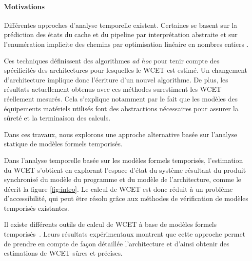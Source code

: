       \paragraph{Motivations}
      { Différentes approches d'analyse temporelle existent. Certaines se basent
        sur la prédiction des états du cache et du pipeline par interprétation
        abstraite et sur l'enumération implicite des chemins par optimisation
        linéaire en nombres entiers \cite{HF04}.

        Ces techniques définissent des algorithmes \textit{ad hoc}
        pour tenir compte des spécificités des architectures pour lesquelles le
        WCET est estimé. Un changement d'architecture implique donc
        l'écriture d'un nouvel algorithme. De plus, les résultats actuellement
        obtenus avec ces méthodes surestiment  les WCET réellement
        mesurés. Cela s'explique notamment par le fait que les modèles des
        équipements matériels utilisés font des abstractions nécessaires pour assurer la sûreté et la terminaison des calculs.

        Dans ces travaux, nous explorons une approche alternative basée sur l'analyse statique de modèles formels temporisés.

        \medskip
        
        Dans l'analyse temporelle basée sur les modèles formels temporisés,
        l'estimation du WCET s'obtient en explorant l'espace d'état du système
        résultant du produit synchronisé du modèle du programme et du modèle
        de l'architecture, comme le décrit la figure
        \ref{fig:intro}. Le calcul de WCET est donc réduit à un problème
        d'accessibilité, qui peut être résolu grâce aux méthodes de
        vérification de modèles temporisés existantes.

        Il existe différents outils de calcul de WCET à base de modèles formels
        temporisés~\cite{DOT10, CB13}. Leurs résultats expérimentaux montrent
        que cette approche permet de prendre en compte de façon détaillée
        l'architecture et d'ainsi obtenir des estimations de WCET sûres et
        précises. }
  
